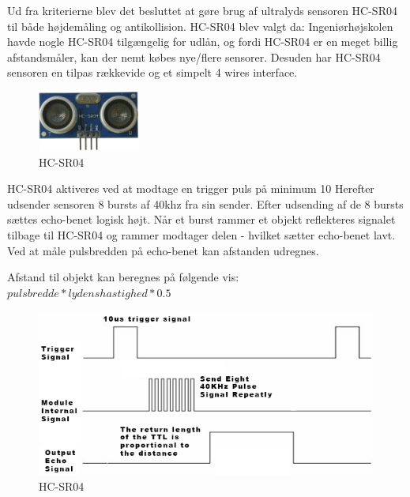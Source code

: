 \vspace{0.5cm}

Ud fra kriterierne blev det besluttet at gøre brug af ultralyds sensoren HC-SR04 til både højdemåling og antikollision. HC-SR04 blev valgt da: Ingeniørhøjskolen havde nogle HC-SR04 tilgængelig for udlån, og fordi HC-SR04 er en meget billig afstandsmåler, kan der nemt købes nye/flere sensorer. Desuden har HC-SR04 sensoren en tilpas rækkevide og et simpelt 4 wires interface. 

\begin{figure}[H]
\centering
\includegraphics[width=0.3\textwidth]{Billeder/Afstandsmaler/ultra_sensor.png}
\caption{HC-SR04}
\label{fig:HC-SR04}
\end{figure}

\newpage

HC-SR04 aktiveres ved at modtage en trigger puls på minimum 10 
Herefter udsender sensoren 8 bursts af 40khz fra sin sender. Efter udsending af de 8 bursts sættes echo-benet logisk højt. Når et burst rammer et objekt reflekteres signalet tilbage til HC-SR04 og rammer modtager delen - hvilket sætter echo-benet lavt. Ved at måle pulsbredden på echo-benet kan afstanden udregnes. 

Afstand til objekt kan beregnes på følgende vis: $pulsbredde * lydenshastighed * 0.5$

\vspace{0.2cm}

\begin{figure}[H]
\centering
\includegraphics[width=1\textwidth]{Billeder/Afstandsmaler/ultra_schematic.png}
\caption{HC-SR04}
\label{fig:HC-SR04}
\end{figure}

\vspace{2cm}








